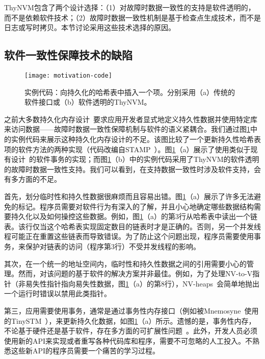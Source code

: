 ThyNVM包含了两个设计选择：（1）对故障时数据一致性的支持是软件透明的，而不是依赖软件技术；（2）故障时数据一致性机制是基于检查点生成技术，而不是日志或写时拷贝。本节讨论采用这些技术选择的原因。

\subsection{软件一致性保障技术的缺陷}

\begin{figure}[!h]
\centering \texttt{[image: motivation-code]}
  \caption{实例代码：向持久化的哈希表中插入一个项。分别采用（a）传统的软件接口或（b）软件透明的ThyNVM。}
\label{fig:motivation-code}
\end{figure}

之前大多数持久化内存设计~\cite{Condit:2009:BIT:1629575.1629589, Volos:2011:MLP:1950365.1950379, Coburn:2011:NMP:1950365.1950380, Zhao:2013:KCP:2540708.2540744, Venkataraman:2011:CDD:1960475.1960480}要求应用开发者显式地定义持久性数据并使用特定库来访问数据——故障时数据一致性保障机制与软件的语义紧耦合。我们通过图\ref{fig:motivation-code}中的实例代码来展示这种持久化内存设计的不足。该图比较了一个更新持久性哈希表项的软件方法的两种实现（代码改编自STAMP~\cite{Cao:2008:STA}）。图\ref{fig:motivation-code}（a）展示了使用类似于现有设计~\cite{Condit:2009:BIT:1629575.1629589, Volos:2011:MLP:1950365.1950379}的软件事务的实现；而图\ref{fig:motivation-code}（b）中的实例代码采用了ThyNVM的软件透明的故障时数据一致性支持。我们可以看到，在支持数据一致性时涉及软件支持，会有多方面的不足。

首先，划分临时性和持久性数据很麻烦而且容易出错。图\ref{fig:motivation-code}（a）展示了许多无法避免的标记。程序员需要对软件行为有深入的了解，并且小心地确定哪些数据结构需要持久化以及如何操控这些数据。例如，图\ref{fig:motivation-code}（a）的第3行从哈希表中读出一个链表。该行仅当这个哈希表实现固定数目的链表时才是正确的。否则，另一个并发线程可能正在重置这些链表而导致错误。为了防止这个问题出现，程序员需要使用事务，来保护对链表的访问（程序第3行）不受并发线程的影响。

其次，在一个统一的地址空间内，临时性和持久性数据之间的引用需要小心的管理。然而，对该问题的基于软件的解决方案并非最佳。例如，为了处理NV-to-V指针（非易失性指针指向易失性数据，图\ref{fig:motivation-code}（a）的第8行），NV-heaps~\cite{Coburn:2011:NMP:1950365.1950380}会简单地抛出一个运行时错误以禁用此类指针。

第三，应用需要使用事务，通常是通过事务性内存接口（例如被Mnemosyne~\cite{Volos:2011:MLP:1950365.1950379}使用的TinySTM~\cite{Felber:2008:DPT}），来更新持久化数据，如图\ref{fig:motivation-code}（a）所示。遗憾的是，事务性内存，不论基于硬件还是基于软件，存在多方面的可扩展性问题~\cite{Cascaval:2008:STM:1454456.1454466, Pankratius:2011:STM:1989493.1989500, Dice:2009:EEC:1508244.1508263}。此外，开发人员必须使用新的API来实现或者重写各种代码库和程序，需要不可忽略的人工投入。不熟悉这些新API的程序员需要一个痛苦的学习过程。


